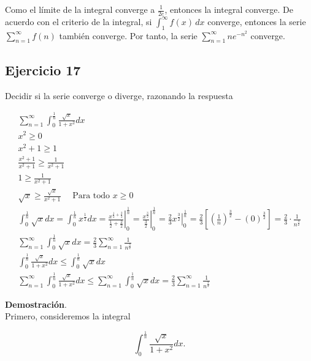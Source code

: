 \documentclass{article}
\begin{document}
    Como el límite de la integral converge a $\frac{1}{2e}$, entonces la integral converge. De acuerdo con el criterio de la integral, si $\int_{1}^{\infty} f(x) \, dx$ converge, entonces la serie $\sum_{n=1}^{\infty} f(n)$ también converge. Por tanto, la serie $\sum_{n=1}^{\infty} n e^{-n^{2}}$ converge.

    \subsection*{Ejercicio 17}

    Decidir si la serie converge o diverge, razonando la respuesta

    $$
    \begin{gathered}
    \sum_{n=1}^{\infty} \int_{0}^{\frac{1}{n}} \frac{\sqrt{x}}{1+x^{2}} d x \\
    x^{2} \geq 0 \\
    x^{2}+1 \geq 1 \\
    \frac{x^{2}+1}{x^{2}+1} \geq \frac{1}{x^{2}+1} \\
    1 \geq \frac{1}{x^{2}+1} \\
    \sqrt{x} \geq \frac{\sqrt{x}}{x^{2}+1} \quad \text { Para todo } x \geq 0 \\
    \int_{0}^{\frac{1}{n}} \sqrt{x} d x=\int_{0}^{\frac{1}{n}} x^{\frac{1}{2}} d x=\left.\frac{x^{\frac{1}{2}+\frac{2}{2}}}{\frac{1}{2}+\frac{2}{2}}\right|_{0} ^{\frac{1}{n}}=\left.\frac{x^{\frac{3}{2}}}{\frac{3}{2}}\right|_{0} ^{\frac{1}{n}}=\left.\frac{2}{3} x^{\frac{3}{2}}\right|_{0} ^{\frac{1}{n}}=\frac{2}{3}\left[\left(\frac{1}{n}\right)^{\frac{3}{2}}-(0)^{\frac{3}{2}}\right]=\frac{2}{3} \cdot \frac{1}{n^{\frac{3}{2}}} \\
    \sum_{n=1}^{\infty} \int_{0}^{\frac{1}{n}} \sqrt{x} d x=\frac{2}{3} \sum_{n=1}^{\infty} \frac{1}{n^{\frac{3}{2}}} \\
    \int_{0}^{\frac{1}{n}} \frac{\sqrt{x}}{1+x^{2}} d x \leq \int_{0}^{\frac{1}{n}} \sqrt{x} d x \\
    \sum_{n=1}^{\infty} \int_{0}^{\frac{1}{n}} \frac{\sqrt{x}}{1+x^{2}} d x \leq \sum_{n=1}^{\infty} \int_{0}^{\frac{1}{n}} \sqrt{x} d x=\frac{2}{3} \sum_{n=1}^{\infty} \frac{1}{n^{\frac{3}{2}}}
    \end{gathered}
    $$

    \textbf{Demostración}.\\

    Primero, consideremos la integral

    $$ \int_{0}^{\frac{1}{n}} \frac{\sqrt{x}}{1+x^{2}} dx. $$
\end{document}
